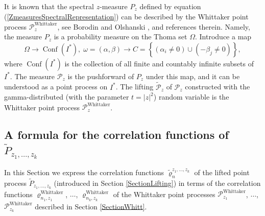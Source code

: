 \documentclass[12pt]{amsart}
\theoremstyle{definition}
\numberwithin{equation}{section}
\DeclareMathOperator{\Conf}{Conf}
\DeclareMathOperator{\Whittaker}{Whittaker}
\begin{document}
It is known that the spectral $z$-measure $P_{z}$ defined by equation (\ref{ZmeasuresSpectralRepresentation}) can be described by
the Whittaker point process $\mathcal{P}_{z}^{\Whittaker}$, see Borodin and Olshanski \cite{BorodinOlshanskiLetters}, and references therein. Namely, the measure $P_z$ is a probability measure on the Thoma set $\Omega$. Introduce
a map
$$
\Omega\longrightarrow\Conf\left(I^{\ast}\right),\;
\omega=(\alpha,\beta)\longrightarrow C=\left\{\left(\alpha_i\neq 0\right)\cup\left(-\beta_j\neq 0\right)\right\},
$$
where $\Conf\left(I^{\ast}\right)$ is the collection of all finite and countably infinite subsets of $I^{\ast}$. The measure $\mathcal{P}_{z}$ is the pushforward of $P_z$ under this map, and it can be understood as a point process on $I^{\ast}$.
The lifting $\widetilde{\mathcal{P}}_z$ of $\mathcal{P}_z$ constructed with the gamma-distributed (with the parameter $t=|z|^2$) random variable is the Whittaker point process $\mathcal{P}_z^{\Whittaker}$.
\subsection{A formula for the correlation functions of $\widetilde{P}_{z_1,\ldots,z_k}$}
In this Section we express the correlation functions $\widetilde{\varrho}_n^{z_1,\ldots,z_k}$ of the lifted point process $\widetilde{P}_{z_1,\ldots,z_k}$ (introduced in Section \ref{SectionLifting}) in terms of the correlation functions
$\varrho_{n_1,z_1}^{\Whittaker}$, $\ldots$, $\varrho_{n_k,z_k}^{\Whittaker}$
of the Whittaker point processes $\mathcal{P}_{z_1}^{\Whittaker}$,
$\ldots$, $\mathcal{P}_{z_k}^{\Whittaker}$  described in Section \ref{SectionWhitt}.
\end{document}

